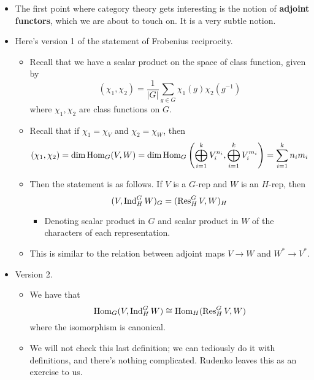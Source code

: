 \documentclass[../notes.tex]{subfiles}
\begin{document}
\begin{itemize}
    \begin{itemize}
        \item The first point where category theory gets interesting is the notion of \textbf{adjoint functors}, which we are about to touch on. It is a very subtle notion.
        \item Here's version 1 of the statement of Frobenius reciprocity.
        \begin{itemize}
            \item Recall that we have a scalar product on the space of class function, given by
            \begin{equation*}
                (\chi_1,\chi_2) = \frac{1}{|G|}\sum_{g\in G}\chi_1(g)\chi_2(g^{-1})
            \end{equation*}
            where $\chi_1,\chi_2$ are class functions on $G$.
            \item Recall that if $\chi_1=\chi_V$ and $\chi_2=\chi_W$, then
            \begin{equation*}
                (\chi_1,\chi_2) = \dim\operatorname{Hom}_G(V,W)
                = \dim\operatorname{Hom}_G\left( \bigoplus_{i=1}^kV_i^{n_i},\bigoplus_{i=1}^kV_i^{m_i} \right)
                = \sum_{i=1}^kn_im_i
            \end{equation*}
            \item Then the statement is as follows. If $V$ is a $G$-rep and $W$ is an $H$-rep, then
            \begin{equation*}
                (V,\operatorname{Ind}_H^GW)_G = (\operatorname{Res}_H^GV,W)_H
            \end{equation*}
            \begin{itemize}
                \item Denoting scalar product in $G$ and scalar product in $W$ of the characters of each representation.
            \end{itemize}
            \item This is similar to the relation between adjoint maps $V\to W$ and $W^*\to V^*$.
        \end{itemize}
        \item Version 2.
        \begin{itemize}
            \item We have that
            \begin{equation*}
                \operatorname{Hom}_G(V,\operatorname{Ind}_H^GW) \cong \operatorname{Hom}_H(\operatorname{Res}_H^GV,W)
            \end{equation*}
            where the isomorphism is canonical.
            \item We will not check this last definition; we can tediously do it with definitions, and there's nothing complicated. Rudenko leaves this as an exercise to us.

\end{itemize}
\end{itemize}
\end{itemize}
\end{document}
